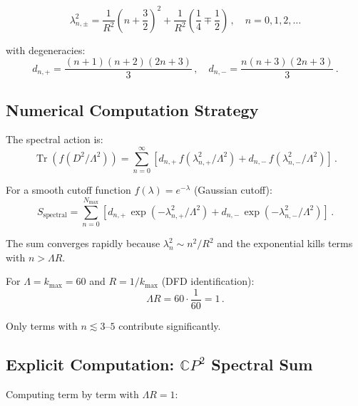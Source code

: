 \documentclass[11pt,a4paper]{article}
\newcommand{\Tr}{\operatorname{Tr}}
\newcommand{\CP}{\mathbb{C}P}
\begin{document}
\begin{equation}
\lambda_{n,\pm}^2 = \frac{1}{R^2}\left(n + \frac{3}{2}\right)^2 + \frac{1}{R^2}\left(\frac{1}{4} \mp \frac{1}{2}\right)\,,\quad n = 0, 1, 2, \ldots
\end{equation}

with degeneracies:
\begin{equation}
d_{n,+} = \frac{(n+1)(n+2)(2n+3)}{3}\,,\quad d_{n,-} = \frac{n(n+3)(2n+3)}{3}\,.
\end{equation}

\subsection{Numerical Computation Strategy}

The spectral action is:
\begin{equation}
\Tr(f(D^2/\Lambda^2)) = \sum_{n=0}^{\infty}\left[d_{n,+}\,f(\lambda_{n,+}^2/\Lambda^2) + d_{n,-}\,f(\lambda_{n,-}^2/\Lambda^2)\right]\,.
\end{equation}

For a smooth cutoff function $f(\lambda) = e^{-\lambda}$ (Gaussian cutoff):
\begin{equation}
S_{\mathrm{spectral}} = \sum_{n=0}^{N_{\max}} \left[d_{n,+}\,\exp(-\lambda_{n,+}^2/\Lambda^2) + d_{n,-}\,\exp(-\lambda_{n,-}^2/\Lambda^2)\right]\,.
\end{equation}

The sum converges rapidly because $\lambda_n^2 \sim n^2/R^2$ and the exponential kills terms with $n > \Lambda R$.

For $\Lambda = k_{\max} = 60$ and $R = 1/k_{\max}$ (DFD identification):
\begin{equation}
\Lambda R = 60 \cdot \frac{1}{60} = 1\,.
\end{equation}

Only terms with $n \lesssim 3$--$5$ contribute significantly.

\subsection{Explicit Computation: $\CP^2$ Spectral Sum}

Computing term by term with $\Lambda R = 1$:
\end{document}
